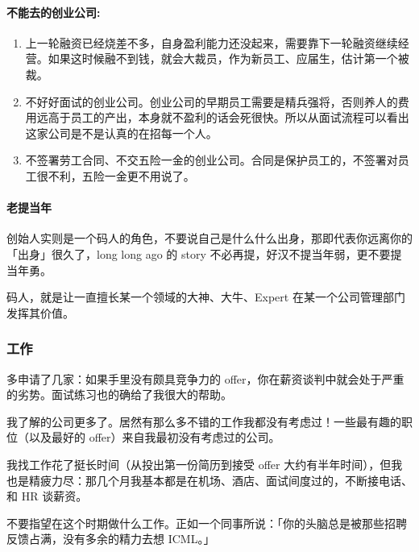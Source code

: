 \documentclass[letterpaper,11pt,english]{sphinxmanual}
\begin{document}
\paragraph{不能去的创业公司:}
\label{\detokenize{chapter_interview/not_go:id4}}\begin{enumerate}
%
\item {} 
上一轮融资已经烧差不多，自身盈利能力还没起来，需要靠下一轮融资继续经营。如果这时候融不到钱，就会大裁员，作为新员工、应届生，估计第一个被裁。

\item {} 
不好好面试的创业公司。创业公司的早期员工需要是精兵强将，否则养人的费用远高于员工的产出，本身就不盈利的话会死很快。所以从面试流程可以看出这家公司是不是认真的在招每一个人。

\item {} 
不签署劳工合同、不交五险一金的创业公司。合同是保护员工的，不签署对员工很不利，五险一金更不用说了。

\end{enumerate}


\paragraph{老提当年}
\label{\detokenize{chapter_interview/not_go:id5}}
创始人实则是一个码人的角色，不要说自己是什么什么出身，那即代表你远离你的「出身」很久了，long
long ago 的 story 不必再提，好汉不提当年弱，更不要提当年勇。

码人，就是让一直擅长某一个领域的大神、大牛、Expert
在某一个公司管理部门发挥其价值。


\subsubsection{工作}
\label{\detokenize{chapter_interview/offer:id1}}\label{\detokenize{chapter_interview/offer::doc}}
多申请了几家：如果手里没有颇具竞争力的
offer，你在薪资谈判中就会处于严重的劣势。面试练习也的确给了我很大的帮助。

我了解的公司更多了。居然有那么多不错的工作我都没有考虑过！一些最有趣的职位（以及最好的
offer）来自我最初没有考虑过的公司。

我找工作花了挺长时间（从投出第一份简历到接受 offer
大约有半年时间），但我也是精疲力尽：那几个月我基本都是在机场、酒店、面试间度过的，不断接电话、和
HR 谈薪资。

不要指望在这个时期做什么工作。正如一个同事所说：「你的头脑总是被那些招聘反馈占满，没有多余的精力去想
ICML。」
\end{document}

